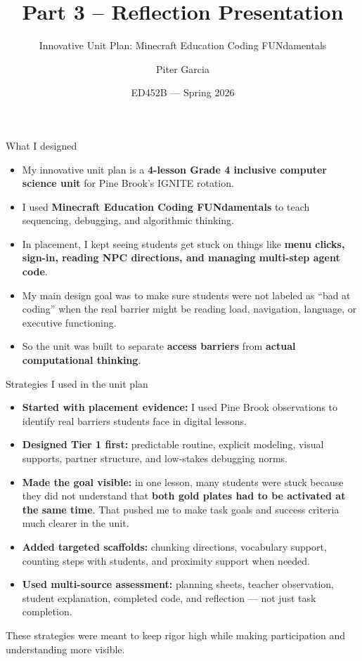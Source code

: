 \documentclass[aspectratio=169,11pt]{beamer}
\title{Part 3 -- Reflection Presentation}
\subtitle{Innovative Unit Plan: Minecraft Education Coding FUNdamentals}
\author{Piter Garcia}
\date{ED452B --- Spring 2026}
\begin{document}
\begin{frame}
  \titlepage
\end{frame}

\begin{frame}{What I designed}
\justifying
\begin{itemize}
  \item My innovative unit plan is a \textbf{4-lesson Grade 4 inclusive computer science unit} for Pine Brook's IGNITE rotation.
  \item I used \textbf{Minecraft Education Coding FUNdamentals} to teach sequencing, debugging, and algorithmic thinking.
  \item In placement, I kept seeing students get stuck on things like \textbf{menu clicks, sign-in, reading NPC directions, and managing multi-step agent code}.
  \item My main design goal was to make sure students were not labeled as \alert{``bad at coding''} when the real barrier might be reading load, navigation, language, or executive functioning.
  \item So the unit was built to separate \textbf{access barriers} from \textbf{actual computational thinking}. 
\end{itemize}
\end{frame}

\begin{frame}{Strategies I used in the unit plan}
\begin{itemize}
  \item \textbf{Started with placement evidence:} I used Pine Brook observations to identify real barriers students face in digital lessons.
  \item \textbf{Designed Tier 1 first:} predictable routine, explicit modeling, visual supports, partner structure, and low-stakes debugging norms.
  \item \textbf{Made the goal visible:} in one lesson, many students were stuck because they did not understand that \textbf{both gold plates had to be activated at the same time}. That pushed me to make task goals and success criteria much clearer in the unit.
  \item \textbf{Added targeted scaffolds:} chunking directions, vocabulary support, counting steps with students, and proximity support when needed.
  \item \textbf{Used multi-source assessment:} planning sheets, teacher observation, student explanation, completed code, and reflection --- not just task completion.
\end{itemize}

\vspace{0.4em}
{\footnotesize These strategies were meant to keep rigor high while making participation and understanding more visible.}
\end{frame}
\end{document}
